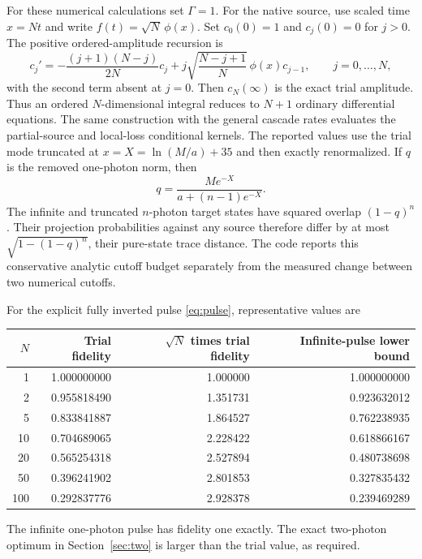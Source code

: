 \documentclass[11pt,a4paper]{article}
\begin{document}
For these numerical calculations set \(\Gamma=1\). For the native
source, use scaled time \(x=Nt\) and write
\(f(t)=\sqrt N\,\phi(x)\). Set \(c_0(0)=1\) and \(c_j(0)=0\)
for \(j>0\). The positive ordered-amplitude recursion is
\begin{equation}
 c_j'=-\frac{(j+1)(N-j)}{2N}c_j+
 j\sqrt{\frac{N-j+1}{N}}\,\phi(x)c_{j-1},
 \qquad j=0,\ldots,N,
 \label{eq:recursion}
\end{equation}
with the second term absent at \(j=0\). Then
\(c_N(\infty)\) is the exact trial amplitude. Thus an ordered
\(N\)-dimensional integral reduces to \(N+1\) ordinary differential
equations. The same construction with the general cascade rates
evaluates the partial-source and local-loss conditional kernels.
The reported values use the trial mode truncated at
\(x=X=\ln(M/a)+35\) and then exactly renormalized. If \(q\) is
the removed one-photon norm, then
\begin{equation}
 q=\frac{M e^{-X}}{a+(n-1)e^{-X}}.
\end{equation}
The infinite and truncated \(n\)-photon target states have squared
overlap \((1-q)^n\). Their projection probabilities against any
source therefore differ by at most
\(\sqrt{1-(1-q)^n}\), their pure-state trace distance. The code
reports this conservative analytic cutoff budget separately from
the measured change between two numerical cutoffs.

For the explicit fully inverted pulse \eqref{eq:pulse},
representative values are
\begin{center}
\begin{tabular}{@{}rrrr@{}}
\toprule
\(N\)&Trial fidelity&\(\sqrt N\) times trial fidelity&
Infinite-pulse lower bound\\
\midrule
1&1.000000000&1.000000&1.000000000\\
2&0.955818490&1.351731&0.923632012\\
5&0.833841887&1.864527&0.762238935\\
10&0.704689065&2.228422&0.618866167\\
20&0.565254318&2.527894&0.480738698\\
50&0.396241902&2.801853&0.327835432\\
100&0.292837776&2.928378&0.239469289\\
\bottomrule
\end{tabular}
\end{center}
The infinite one-photon pulse has fidelity one exactly. The exact
two-photon optimum in Section~\ref{sec:two} is larger than the
trial value, as required.
\end{document}
